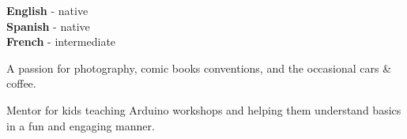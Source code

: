 \documentclass[10pt]{developercv} %
\begin{document}
\begin{entrylist}
\end{entrylist}






\begin{minipage}[t]{0.25\textwidth}
	\vspace{-\baselineskip} %
	
	\textbf{English} - native\\
	\textbf{Spanish} - native\\
	\textbf{French} - intermediate
\end{minipage}
\hfill
\begin{minipage}[t]{0.25\textwidth}
	\vspace{-\baselineskip} %
	
	\footnotesize A passion for photography, comic books conventions, and the \mbox{occasional} cars \& coffee.
\end{minipage}
\hfill
\begin{minipage}[t]{0.25\textwidth}
	\vspace{-\baselineskip} %

	\footnotesize Mentor for kids teaching Arduino workshops and helping them understand
	basics in a fun and engaging manner.
\end{minipage}

\end{document}
